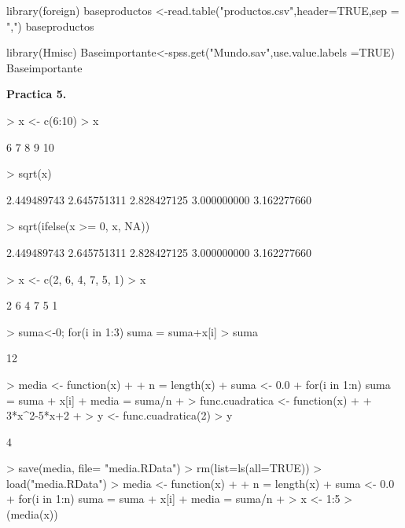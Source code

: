 \documentclass{article}
\begin{document}
library(foreign)
baseproductos <-read.table("productos.csv",header=TRUE,sep = ",")
baseproductos

library(Hmisc)
Baseimportante<-spss.get("Mundo.sav",use.value.labels =TRUE)
Baseimportante




\textbf{Practica 5.}


\begin{Schunk}
\begin{Sinput}
> x <- c(6:10)
> x
\end{Sinput}
\begin{Soutput}
[1]  6  7  8  9 10
\end{Soutput}
\begin{Sinput}
> sqrt(x) 
\end{Sinput}
\begin{Soutput}
[1] 2.449489743 2.645751311 2.828427125 3.000000000 3.162277660
\end{Soutput}
\begin{Sinput}
> sqrt(ifelse(x >= 0, x, NA))
\end{Sinput}
\begin{Soutput}
[1] 2.449489743 2.645751311 2.828427125 3.000000000 3.162277660
\end{Soutput}
\begin{Sinput}
> x <- c(2, 6, 4, 7, 5, 1)
> x
\end{Sinput}
\begin{Soutput}
[1] 2 6 4 7 5 1
\end{Soutput}
\begin{Sinput}
> suma<-0; for(i in 1:3) suma = suma+x[i]
> suma
\end{Sinput}
\begin{Soutput}
[1] 12
\end{Soutput}
\begin{Sinput}
> media <- function(x)
+ {
+ n = length(x)
+ suma <- 0.0
+ for(i in 1:n) suma = suma + x[i]
+ media = suma/n
+ }
> func.cuadratica <- function(x)
+ {
+ 3*x^2-5*x+2
+ }
> y <- func.cuadratica(2)
> y
\end{Sinput}
\begin{Soutput}
[1] 4
\end{Soutput}
\begin{Sinput}
> save(media, file= "media.RData")
> rm(list=ls(all=TRUE))
> load("media.RData")
> media <- function(x)
+ {
+ n = length(x)
+ suma <- 0.0
+ for(i in 1:n) suma = suma + x[i]
+ media = suma/n
+ }
> x <- 1:5
> (media(x))
\end{Sinput}
\begin{Soutput}

\end{Soutput}
\end{Schunk}
\end{document}
